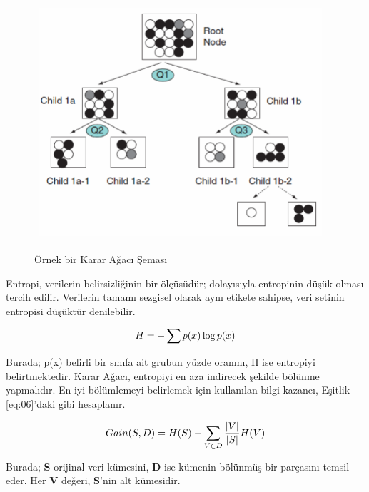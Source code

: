\documentclass[conference]{IEEEtran}
\begin{document}
\begin{figure}[!h]
	\centering%
	\begin{center}
		\begin{tabular}{cc}%
			\includegraphics[scale=0.4]{pictures/pic_05.png}&%
		\end{tabular}%
	\end{center}
	\caption{Örnek bir Karar Ağacı Şeması\cite{17}}%
	\label{fig:05}
\end{figure}

\quad Entropi, verilerin belirsizliğinin bir ölçüsüdür; dolayısıyla entropinin düşük olması tercih edilir. Verilerin tamamı sezgisel olarak aynı etikete sahipse, veri setinin entropisi düşüktür denilebilir\cite{16}.

\begin{equation}
\label{eq:05}
\Large H=-\sum p(x)\log{p(x)}
\end{equation}

\quad Burada; p(x) belirli bir sınıfa ait grubun yüzde oranını, H ise entropiyi belirtmektedir. Karar Ağacı, entropiyi en aza indirecek şekilde bölünme yapmalıdır. En iyi bölümlemeyi belirlemek için kullanılan bilgi kazancı, Eşitlik \ref{eq:06}'daki gibi hesaplanır\cite{16}.

\begin{equation}
\label{eq:06}
\Large Gain(S,D) = H(S)-\sum_{V\in D}^{}\frac{\left|V\right|}{\left|S\right|}H(V)
\end{equation}

\quad Burada; \textbf{S} orijinal veri kümesini, \textbf{D} ise kümenin bölünmüş bir parçasını temsil eder. Her \textbf{V} değeri, \textbf{S}'nin alt kümesidir\cite{16}.
\pagebreak
\end{document}

